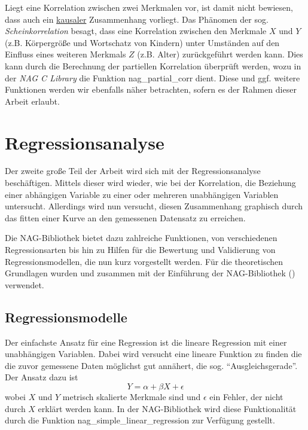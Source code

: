 \documentclass{article}
\begin{document}
Liegt eine Korrelation zwischen zwei Merkmalen vor, ist damit nicht bewiesen, dass auch ein \underline{kausaler} Zusammenhang vorliegt. Das Phänomen der sog. {\it Scheinkorrelation} besagt, dass eine Korrelation zwischen den Merkmale $X$ und $Y$ (z.B. Körpergröße und Wortschatz von Kindern) unter Umständen auf den Einfluss eines weiteren Merkmals $Z$ (z.B. Alter) zurückgeführt werden kann. Dies kann durch die Berechnung der partiellen Korrelation überprüft werden, wozu in der {\it NAG C Library} die Funktion nag\_partial\_corr dient. Diese und ggf. weitere Funktionen werden wir ebenfalls näher betrachten, sofern es der Rahmen dieser Arbeit erlaubt.

\section{Regressionsanalyse}

Der zweite große Teil der Arbeit wird sich mit der Regressionsanalyse beschäftigen.
Mittels dieser wird wieder, wie bei der Korrelation, die Beziehung einer abhängigen Variable zu einer oder mehreren unabhängigen Variablen untersucht.
Allerdings wird nun versucht, diesen Zusammenhang graphisch durch das fitten einer Kurve an den gemessenen Datensatz zu erreichen.

Die NAG-Bibliothek bietet dazu zahlreiche Funktionen, von verschiedenen Regressionsarten bis hin zu Hilfen für die Bewertung und Validierung von Regressionsmodellen, die nun kurz vorgestellt werden.
Für die theoretischen Grundlagen wurden \cite{Cramer2007} und \cite{Fahrmeier2010} zusammen mit der Einführung der NAG-Bibliothek (\cite{nag:intro}) verwendet.

\subsection{Regressionsmodelle}

Der einfachste Ansatz für eine Regression ist die lineare Regression mit einer unabhängigen Variablen.
Dabei wird versucht eine lineare Funktion zu finden die die zuvor gemessene Daten möglichst gut annähert, die sog. "`Ausgleichsgerade"'.
Der Ansatz dazu ist
\begin{equation*}
 Y = \alpha + \beta X +\epsilon
\end{equation*}
wobei $X$ und $Y$ metrisch skalierte Merkmale sind und $\epsilon$ ein Fehler, der nicht durch $X$ erklärt werden kann.
In der NAG-Bibliothek wird diese Funktionalität durch die Funktion nag\_simple\_linear\_regression zur Verfügung gestellt.
\end{document}
